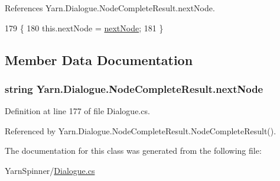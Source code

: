 References Yarn.\-Dialogue.\-Node\-Complete\-Result.\-next\-Node.


\begin{DoxyCode}
179                                                         \{
180                 this.nextNode = \hyperlink{a00129_ad48b37b51066b94cd48c58626ac0e774}{nextNode};
181             \}
\end{DoxyCode}


\subsection{Member Data Documentation}
\hypertarget{a00129_ad48b37b51066b94cd48c58626ac0e774}{
\subsubsection[{next\-Node}]{\setlength{\rightskip}{0pt plus 5cm}string Yarn.\-Dialogue.\-Node\-Complete\-Result.\-next\-Node}}\label{a00129_ad48b37b51066b94cd48c58626ac0e774}


Definition at line 177 of file Dialogue.\-cs.



Referenced by Yarn.\-Dialogue.\-Node\-Complete\-Result.\-Node\-Complete\-Result().



The documentation for this class was generated from the following file\-:\begin{DoxyCompactItemize}
\item 
Yarn\-Spinner/\hyperlink{a00290}{Dialogue.\-cs}\end{DoxyCompactItemize}

